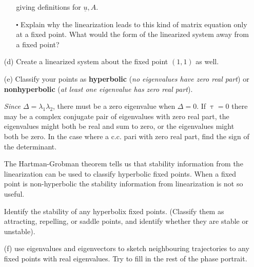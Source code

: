 \documentclass[12pt]{amsart}
\theoremstyle{conjecture}
\theoremstyle{definition}
\theoremstyle{question}
\theoremstyle{theorem}
\begin{document}
\begin{itemize}
\begin{itemize}
\[            \]
            giving definitions for $\underline{u}, A$.
            \item[$\centerdot$] Explain why the linearization leads to this kind of matrix equation only
            at a fixed point.
            What would the form of the linearized system away from a fixed point?
        \end{itemize}
        \item[(d)] Create a linearized system about the fixed point $(1,1)$ as well.
        \item[(e)] Classify your points as \textbf{hyperbolic} (\emph{no eigenvalues have zero real part}) or
        \textbf{nonhyperbolic} (\emph{at least one eigenvalue has zero real part}).

        \emph{Since $\Delta=\lambda_1\lambda_2$}, there must be a zero eigenvalue when $\Delta=0$.
        If $\uptau = 0$ there may be a complex conjugate pair of eigenvalues with zero real part, the
        eigenvalues might both be real and sum to zero, or the eigenvalues might both be zero.
        In the case where a c.c. pari with zero real part, find the sign of the determinant.

        The Hartman-Grobman theorem tells us that stability information from the linearization
        can be used to classify hyperbolic fixed points.
        When a fixed point is non-hyperbolic the stability information from linearization is not so useful.

        Identify the stability of any hyperbolix fixed points.
        (Classify them as attracting, repelling, or saddle points, and identify whether they are stable or unstable).

        \item[(f)] use eigenvalues and eigenvectors to sketch neighbouring trajectories to any
        fixed points with real eigenvalues.
        Try to fill in the rest of the phase portrait.
    \end{itemize}
\end{document}
